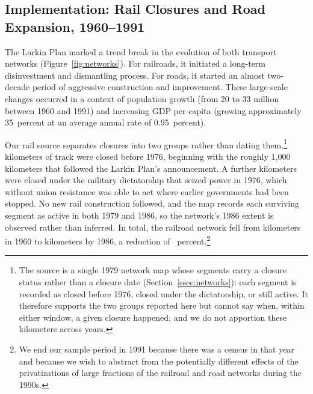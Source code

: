 \subsection{Implementation: Rail Closures and Road Expansion,
            1960--1991}
\label{ssec:implementation}

The Larkin Plan marked a trend break in the evolution of both
transport networks (Figure~\ref{fig:networks}). For railroads, it
initiated a long-term disinvestment and dismantling process. For
roads, it started an almost two-decade period of aggressive
construction and improvement. These large-scale changes occurred in
a context of population growth (from 20 to 33 million between 1960
and 1991) and increasing GDP per capita (growing approximately
35~percent at an average annual rate of 0.95~percent).

Our rail source separates closures into two groups rather than dating
them.\footnote{The source is a single 1979 network map whose segments
carry a closure status rather than a closure date
(Section~\ref{ssec:networks}): each segment is recorded as closed before
1976, closed under the dictatorship, or still active. It therefore
supports the two groups reported here but cannot say when, within either
window, a given closure happened, and we do not apportion these
kilometers across years.} \railKmClosedPreSeventySix{} kilometers of
track were closed before 1976, beginning with the roughly
1{,}000 kilometers that followed the Larkin Plan's announcement. A
further \railKmDictatorship{} kilometers were closed under the military
dictatorship that seized power in 1976, which without union resistance
was able to act where earlier governments had been stopped. No new rail
construction followed, and the map records each surviving segment as
active in both 1979 and 1986, so the network's 1986 extent is observed
rather than inferred. In
total, the railroad network fell from
\railKmSixty{} kilometers in 1960 to \railKmEightySix{} kilometers by
1986, a reduction of \railPctFall{}~percent.\footnote{We end our sample
period in 1991 because there was a census in that year and because
we wish to abstract from the potentially different effects of the
privatizations of large fractions of the railroad and road networks
during the 1990s.}

